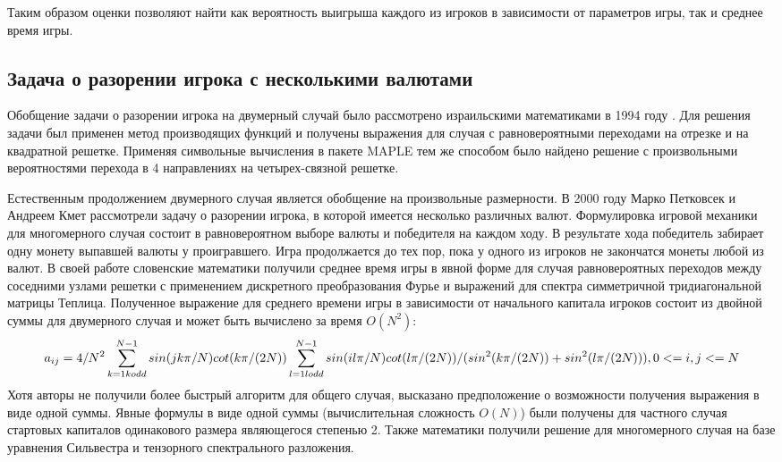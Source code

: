 Таким образом оценки позволяют найти как вероятность выигрыша каждого из игроков в зависимости от параметров игры, так и среднее время игры.

\subsection{Задача о разорении игрока с несколькими валютами}\label{subsec:ch1/sec1/sub2}

Обобщение задачи о разорении игрока на двумерный случай было рассмотрено израильскими математиками в 1994 году \cite{}. 
Для решения задачи был применен метод производящих функций и получены выражения для случая с равновероятными переходами на отрезке и на квадратной решетке.
Применяя символьные вычисления в пакете MAPLE \cite{} тем же способом было найдено решение с произвольными вероятностями перехода в 4 направлениях 
на четырех-связной решетке. 

Естественным продолжением двумерного случая является обобщение на произвольные размерности. В 2000 году Марко Петковсек и Андреем Кмет 
рассмотрели задачу о разорении игрока, в которой имеется несколько различных валют. \cite{}
Формулировка игровой механики для многомерного случая состоит в равновероятном выборе валюты и победителя на каждом ходу.
В результате хода победитель забирает одну монету выпавшей валюты у проигравшего. Игра продолжается до тех пор, пока у одного из игроков не закончатся монеты любой из валют.
В своей работе словенские математики получили среднее время игры в явной форме для случая равновероятных переходов между соседними узлами решетки
с применением дискретного преобразования Фурье и выражений для спектра симметричной тридиагональной матрицы Теплица.
Полученное выражение для среднего времени игры в зависимости от начального капитала игроков состоит из двойной суммы для двумерного случая 
и может быть вычислено за время $O(N^2)$: 
\begin{equation}
    \label{eq:eq2}
    a_{ij} = 4 / N^2 \sum_{k=1\\ k odd}^{N - 1} sin(jk\pi/N)cot(k\pi/(2N)) \sum_{l=1\\ l odd}^{N - 1} sin(il\pi/N)cot(l\pi/(2N))/(sin^2(k\pi/(2N))+sin^2(l\pi/(2N))),
    0 <= i, j <= N
\end{equation}
Хотя авторы не получили более быстрый алгоритм для общего случая, высказано предположение о возможности получения выражения в виде одной суммы.
Явные формулы в виде одной суммы (вычислительная сложность $O(N)$) были получены для частного случая стартовых капиталов одинакового размера являющегося степенью 2.
Также математики получили решение для многомерного случая на базе уравнения Сильвестра и тензорного спектрального разложения.

